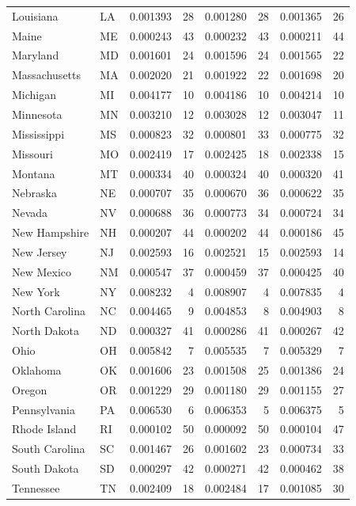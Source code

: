 \documentclass{article}
\begin{document}
\begin{table}[H]
\begin{tabular}{llrrrrrr}
Louisiana & LA & 0.001393 & 28 & 0.001280 & 28 & 0.001365 & 26 \\
Maine & ME & 0.000243 & 43 & 0.000232 & 43 & 0.000211 & 44 \\
Maryland & MD & 0.001601 & 24 & 0.001596 & 24 & 0.001565 & 22 \\
Massachusetts & MA & 0.002020 & 21 & 0.001922 & 22 & 0.001698 & 20 \\
Michigan & MI & 0.004177 & 10 & 0.004186 & 10 & 0.004214 & 10 \\
Minnesota & MN & 0.003210 & 12 & 0.003028 & 12 & 0.003047 & 11 \\
Mississippi & MS & 0.000823 & 32 & 0.000801 & 33 & 0.000775 & 32 \\
Missouri & MO & 0.002419 & 17 & 0.002425 & 18 & 0.002338 & 15 \\
Montana & MT & 0.000334 & 40 & 0.000324 & 40 & 0.000320 & 41 \\
Nebraska & NE & 0.000707 & 35 & 0.000670 & 36 & 0.000622 & 35 \\
Nevada & NV & 0.000688 & 36 & 0.000773 & 34 & 0.000724 & 34 \\
New Hampshire & NH & 0.000207 & 44 & 0.000202 & 44 & 0.000186 & 45 \\
New Jersey & NJ & 0.002593 & 16 & 0.002521 & 15 & 0.002593 & 14 \\
New Mexico & NM & 0.000547 & 37 & 0.000459 & 37 & 0.000425 & 40 \\
New York & NY & 0.008232 & 4 & 0.008907 & 4 & 0.007835 & 4 \\
North Carolina & NC & 0.004465 & 9 & 0.004853 & 8 & 0.004903 & 8 \\
North Dakota & ND & 0.000327 & 41 & 0.000286 & 41 & 0.000267 & 42 \\
Ohio & OH & 0.005842 & 7 & 0.005535 & 7 & 0.005329 & 7 \\
Oklahoma & OK & 0.001606 & 23 & 0.001508 & 25 & 0.001386 & 24 \\
Oregon & OR & 0.001229 & 29 & 0.001180 & 29 & 0.001155 & 27 \\
Pennsylvania & PA & 0.006530 & 6 & 0.006353 & 5 & 0.006375 & 5 \\
Rhode Island & RI & 0.000102 & 50 & 0.000092 & 50 & 0.000104 & 47 \\
South Carolina & SC & 0.001467 & 26 & 0.001602 & 23 & 0.000734 & 33 \\
South Dakota & SD & 0.000297 & 42 & 0.000271 & 42 & 0.000462 & 38 \\
Tennessee & TN & 0.002409 & 18 & 0.002484 & 17 & 0.001085 & 30 \\

\end{tabular}
\end{table}
\end{document}
